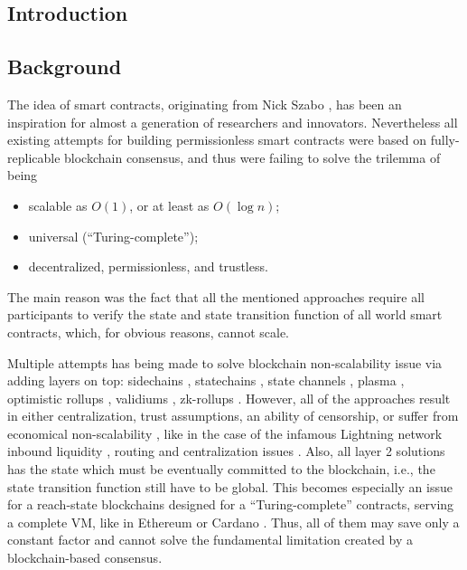 \documentclass[9pt,oneside]{amsart}
\begin{document}
\thispagestyle{empty}
\setlength{\columnsep}{20pt}
\begin{multicols}{2}

\section{Introduction}

\subsection{Background}

The idea of smart contracts, originating from Nick Szabo \cite{Szabo},
has been an inspiration for almost a generation of researchers and innovators.
Nevertheless all existing attempts for building permissionless smart contracts
were based on fully-replicable blockchain consensus,
and thus were failing to solve the trilemma of being
\begin{itemize}
    \item scalable as $O(1)$, or at least as $O(\log n)$;
    \item universal (``Turing-complete'');
    \item decentralized, permissionless, and trustless.
\end{itemize}

The main reason was the fact that all the mentioned approaches require
all participants to verify the state and state transition function of all world smart contracts,
which, for obvious reasons, cannot scale.

Multiple attempts has being made to solve blockchain non-scalability issue
via adding layers on top: sidechains \cite{sidechains, drivechains},
statechains \cite{statechains}, state channels \cite{lightning, eltoo}, plasma \cite{plasma},
optimistic rollups \cite{optimism}, validiums \cite{validium},
zk-rollups \cite{zk-rollups, Cairo, mina}.
However, all of the approaches result in either
centralization, trust assumptions, an ability of censorship,
or suffer from economical non-scalability \cite{drivechainsucks, plasmasucks, rollupsucks},
like in the case of the infamous Lightning network inbound liquidity \cite{lightningsucks1, lightningsucks4},
routing \cite{lightningsucks2} and centralization issues \cite{lightningsucks3, lightningsucks5}.
Also, all layer 2 solutions has the state which must be eventually committed
to the blockchain, i.e., the state transition function still have to be global.
This becomes especially an issue for a reach-state blockchains designed for a
``Turing-complete'' contracts, serving a complete VM,
like in Ethereum \cite{ethereum} or Cardano \cite{cardano}.
Thus, all of them may save only a constant factor and cannot solve the fundamental
limitation created by a blockchain-based consensus.


\end{multicols}
\end{document}
